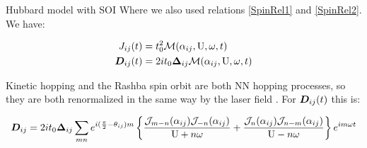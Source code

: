 \begin{section}{Hubbard model with SOI}
Where we also used relations \ref{SpinRel1} and \ref{SpinRel2}. We have:

\begin{align}
J_{ij}(t) &= t_0^2\mathcal{M}(\alpha_{ij}, \text{U}, \omega, t) \\
\boldsymbol{D}_{ij}(t) &= 2it_0\boldsymbol{\Delta}_{ij} \mathcal{M}(\alpha_{ij}, \text{U}, \omega, t)
\end{align}

Kinetic hopping and the Rashba spin orbit are both NN hopping processes, so they are both renormalized in the same way by the laser field \cite{Stepanov2017}.
For $\boldsymbol{D}_{ij}(t)$ this is:

\begin{equation}
\boldsymbol{D}_{ij} = 2it_0 \boldsymbol{\Delta}_{ij} \sum_{mn}e^{i(\frac{\pi}{2}-\theta_{ij})m} \left\{ 
    \frac{\mathcal{J}_{m-n}(\alpha_{ij})\mathcal{J}_{-n}(\alpha_{ij})}{\text{U}+n\omega} +
    \frac{\mathcal{J}_n(\alpha_{ij})\mathcal{J}_{n-m}(\alpha_{ij})}{\text{U}-n\omega}    
    \right\}e^{im\omega t}
\end{equation}

\end{section}

